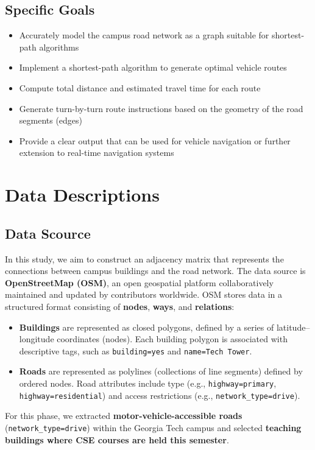 \documentclass[fleqn,10pt]{olplainarticle}
\begin{document}
\subsection*{Specific Goals}
\begin{itemize}
    \item Accurately model the campus road network as a graph suitable for shortest-path algorithms
    \item Implement a shortest-path algorithm to generate optimal vehicle routes
    \item Compute total distance and estimated travel time for each route
    \item Generate turn-by-turn route instructions based on the geometry of the road segments (edges)
    \item Provide a clear output that can be used for vehicle navigation or further extension to real-time navigation systems
\end{itemize}

\section*{Data Descriptions}
\subsection{Data Scource}
In this study, we aim to construct an adjacency matrix that represents the connections between campus buildings and the road network. The data source is \textbf{OpenStreetMap (OSM)}, an open geospatial platform collaboratively maintained and updated by contributors worldwide. OSM stores data in a structured format consisting of \textbf{nodes}, \textbf{ways}, and \textbf{relations}:
\begin{itemize}
    \item \textbf{Buildings} are represented as closed polygons, defined by a series of latitude–longitude coordinates (nodes). Each building polygon is associated with descriptive tags, such as \texttt{building=yes} and \texttt{name=Tech Tower}.

    \item \textbf{Roads} are represented as polylines (collections of line segments) defined by ordered nodes. Road attributes include type (e.g., \texttt{highway=primary}, \texttt{highway=residential}) and access restrictions (e.g., \texttt{network\_type=drive}).
\end{itemize}


For this phase, we extracted \textbf{motor-vehicle-accessible roads} (\texttt{network\_type=drive}) within the Georgia Tech campus and selected \textbf{teaching buildings where CSE courses are held this semester}.
\end{document}
